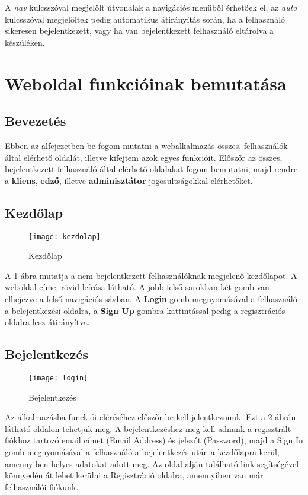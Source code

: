 A \textit{nav} kulcsszóval megjelölt útvonalak a navigációs menüből érhetőek el, az \textit{auto} kulcsszóval megjelöltek pedig automatikus átirányítás során, ha a felhasználó sikeresen bejelentkezett, vagy ha van bejelentkezett felhasználó eltárolva a készüléken.

\section{Weboldal funkcióinak bemutatása}

\subsection{Bevezetés}

Ebben az alfejezetben be fogom mutatni a webalkalmazás összes, felhasználók által elérhető oldalát, illetve kifejtem azok egyes funkcióit. Előszőr az összes, bejelentkezett felhasználó által elérhető oldalakat fogom bemutatni, majd rendre a \textbf{kliens}, \textbf{edző}, illetve \textbf{adminisztátor} jogosultságokkal elérhetőket.

\subsection{Kezdőlap}

\begin{figure}[H]
	\centering
	\texttt{[image: kezdolap]}
	\caption{Kezdőlap}
	\label{fig:kezdolap}
\end{figure}

A \ref{fig:kezdolap} ábra mutatja a nem bejelentkezett felhasználóknak megjelenő kezdőlapot. A weboldal címe, rövid leírása látható. A jobb felső sarokban két gomb van elhejezve a felső navigációs sávban. A \textbf{Login} gomb megnyomásával a felhasználó a belejentkezési oldalra, a \textbf{Sign Up} gombra kattintással pedig a regisztrációs oldalra lesz átirányítva.

\subsection{Bejelentkezés}

\begin{figure}[H]
	\centering
	\texttt{[image: login]}
	\caption{Bejelentkezés}
	\label{fig:login}
\end{figure}

Az alkalmazásba funckiói eléréséhez előszőr be kell jelentkeznünk. Ezt a \ref{fig:login} ábrán látható oldalon tehetjük meg. A bejelentkezéshez meg kell adnunk a regisztrált fiókhoz tartozó email címet (Email Address) és jelszót (Password), majd a Sign In gomb megnyomásával a felhasználó a bejelentkezés után a kezdőlapra kerül, amennyiben helyes adatokat adott meg. Az oldal alján található link segítségével könnyedén át lehet kerülni a Regisztráció oldalra, amennyiben van már felhasználói fiókunk.

